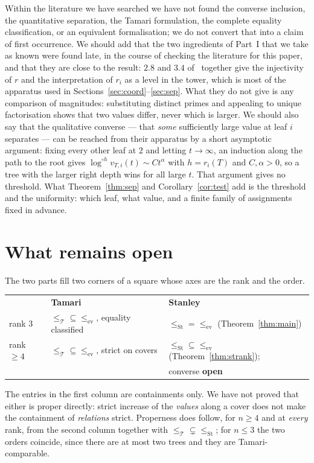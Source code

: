 \documentclass[11pt,a4paper]{article}
\theoremstyle{plain}
\theoremstyle{definition}
\newcommand{\ev}{\mathrm{ev}}
\newcommand{\Tam}{\mathcal{T}}
\newcommand{\St}{\mathrm{St}}
\begin{document}
Within the literature we have searched we have not found the converse inclusion, the
quantitative separation, the Tamari formulation, the complete equality classification,
or an equivalent formalisation; we do not convert that into a claim of first occurrence.
We should add that the two ingredients of Part~I that we take as known were found late,
in the course of checking the literature for this paper, and that they are close to the
result: $2.8$ and $3.4$ of~\cite{CsW} together give the injectivity of $r$ and the
interpretation of $r_i$ as a level in the tower, which is most of the apparatus used in
Sections~\ref{sec:coord}--\ref{sec:sep}. What they do not give is any comparison of
magnitudes: substituting distinct primes and appealing to unique factorisation shows
that two values differ, never which is larger. We should also say that the qualitative
converse --- that \emph{some} sufficiently large value at leaf $i$ separates --- can be
reached from their apparatus by a short asymptotic argument: fixing every other leaf at
$2$ and letting $t\to\infty$, an induction along the path to the root gives
$\log^{\circ h}v_{T,i}(t)\sim Ct^{\alpha}$ with $h=r_i(T)$ and $C,\alpha>0$, so a tree
with the larger right depth wins for all large $t$. That argument gives no threshold.
What Theorem~\ref{thm:sep} and Corollary~\ref{cor:test} add is the threshold and the
uniformity: which leaf, what value, and a finite family of assignments fixed in advance.

\section{What remains open}\label{sec:open}

The two parts fill two corners of a square whose axes are the rank and the order.

\medskip
\begin{center}
\begin{tabular}{lll}
 & \textbf{Tamari} & \textbf{Stanley}\\[2pt]
rank $3$ & $\le_{\Tam}\subseteq\le_{\ev}$, equality classified & $\le_{\St}=\le_{\ev}$
   (Theorem~\ref{thm:main})\\
rank $\ge4$ & $\le_{\Tam}\subseteq\le_{\ev}$, strict on covers &
   $\le_{\St}\subseteq\le_{\ev}$ (Theorem~\ref{thm:strank});\\
 & & converse \textbf{open}
\end{tabular}
\end{center}
\medskip

\noindent The entries in the first column are containments only. We have not proved
that either is proper directly: strict increase of the \emph{values} along a cover does
not make the containment of \emph{relations} strict. Properness does follow, for
$n\ge4$ and at \emph{every} rank, from the second column together with
$\le_{\Tam}\subsetneq\le_{\St}$; for $n\le3$ the two orders coincide, since there are
at most two trees and they are Tamari-comparable.
\end{document}
